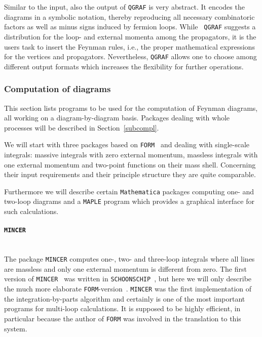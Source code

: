 Similar to the input, also the output of {\tt QGRAF} is very abstract.
It encodes the diagrams in a symbolic notation,
thereby reproducing all necessary combinatoric
factors as well as minus signs induced by fermion loops. While {\tt
  QGRAF} suggests a distribution for the loop- and external momenta
among the propagators, it is the users task to insert the Feynman rules,
i.e., the proper mathematical expressions for the vertices and
propagators.  Nevertheless, {\tt QGRAF} allows one to choose among different
output formats which increases the flexibility for further operations.



\subsubsection{\label{sec:surv:comp}Computation of diagrams}

%
This section lists programs to be used for the computation of Feynman
diagrams, all working on a diagram-by-diagram basis. Packages dealing
with whole processes will be described in Section~\ref{subcompl}.

We will start with three packages based on {\tt FORM}~\cite{form} and
dealing with single-scale integrals: massive integrals with zero
external momentum, massless integrals with one external momentum and
two-point functions on their mass shell.  Concerning their input
requirements and their principle structure they are quite comparable.

Furthermore we will describe certain {\tt Mathematica} packages
computing one- and two-loop diagrams and a {\tt MAPLE} program which
provides a graphical interface for such calculations.


\paragraph{{\tt MINCER}}\mbox{}\\[1em]
%
The package {\tt MINCER} computes one-, two- and three-loop integrals
where all lines are massless and only one external momentum is different
from zero.  The first version of {\tt MINCER}~\cite{MINCER1} was written
in {\tt SCHOONSCHIP}~\cite{VelSS}, but here we will only describe the
much more elaborate {\tt FORM}-version~\cite{mincer2}. {\tt MINCER} was
the first implementation of the integration-by-parts algorithm and
certainly is one of the most important programs for multi-loop
calculations. It is supposed to be highly efficient, in particular
because the author of {\tt FORM} was involved in the translation to this
system.

